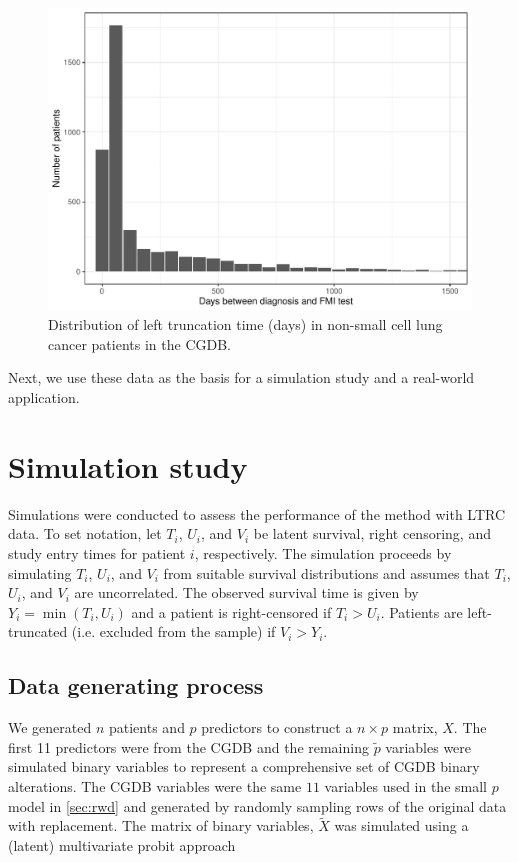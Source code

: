 \documentclass[11pt,final,fleqn]{article}\usepackage[]{graphicx}\usepackage[]{color}
\theoremstyle{plain}
\begin{document}
\begin{figure}[h]
 \centering
\includegraphics[max size={\textwidth}]{figs/left_trunc_hist.pdf} 
\caption{Distribution of left truncation time (days) in non-small cell lung cancer patients in the CGDB.}
 \label{fig:left-trunc-time}
\end{figure}

Next, we use these data as the basis for a simulation study and a real-world application.

\section{Simulation study} \label{sec:simulation}
Simulations were conducted to assess the performance of the method with LTRC data. To set notation, let $T_i$, $U_i$, and $V_i$ be latent survival, right censoring, and study entry times for patient $i$, respectively. The simulation proceeds by simulating $T_i$, $U_i$, and $V_i$ from suitable survival distributions and assumes that $T_i$, $U_i$, and $V_i$ are uncorrelated. The observed survival time is given by $Y_i = \min(T_i, U_i)$ and a patient is right-censored if $T_i > U_i$. Patients are left-truncated (i.e. excluded from the sample) if $V_i > Y_i$. 

\subsection{Data generating process}
We generated $n$ patients and $p$ predictors to construct a $n \times p$ matrix, $X$. The first 11 predictors were from the CGDB and the remaining $\tilde{p}$ variables were simulated binary variables to represent a comprehensive set of CGDB binary alterations. The CGDB variables were the same $11$ variables used in the small $p$ model in \autoref{sec:rwd} and generated by randomly sampling rows of the original data with replacement. The matrix of binary variables, $\tilde{X}$ was simulated using a (latent) multivariate probit approach
\end{document}

